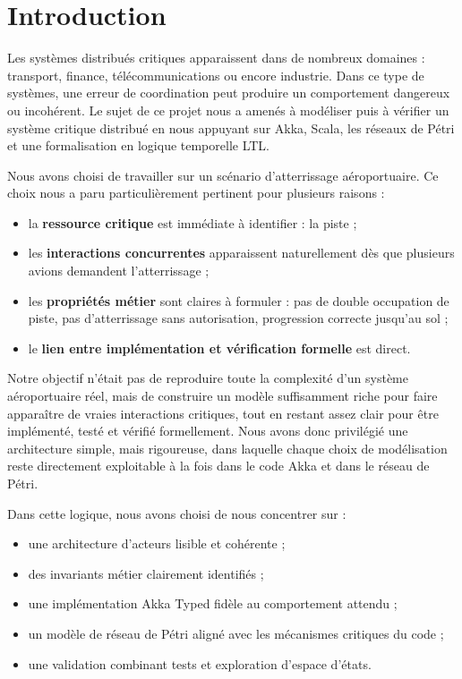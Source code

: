 \documentclass[11pt,a4paper]{article}
\begin{document}
\tableofcontents
\clearpage
{}

\section{Introduction}

Les systèmes distribués critiques apparaissent dans de nombreux domaines : transport, finance, télécommunications ou encore industrie. Dans ce type de systèmes, une erreur de coordination peut produire un comportement dangereux ou incohérent. Le sujet de ce projet nous a amenés à modéliser puis à vérifier un système critique distribué en nous appuyant sur Akka, Scala, les réseaux de Pétri et une formalisation en logique temporelle LTL.

Nous avons choisi de travailler sur un scénario d'atterrissage aéroportuaire. Ce choix nous a paru particulièrement pertinent pour plusieurs raisons :
\begin{itemize}
    \item la \textbf{ressource critique} est immédiate à identifier : la piste ;
    \item les \textbf{interactions concurrentes} apparaissent naturellement dès que plusieurs avions demandent l'atterrissage ;
    \item les \textbf{propriétés métier} sont claires à formuler : pas de double occupation de piste, pas d'atterrissage sans autorisation, progression correcte jusqu'au sol ;
    \item le \textbf{lien entre implémentation et vérification formelle} est direct.
\end{itemize}

Notre objectif n'était pas de reproduire toute la complexité d'un système aéroportuaire réel, mais de construire un modèle suffisamment riche pour faire apparaître de vraies interactions critiques, tout en restant assez clair pour être implémenté, testé et vérifié formellement. Nous avons donc privilégié une architecture simple, mais rigoureuse, dans laquelle chaque choix de modélisation reste directement exploitable à la fois dans le code Akka et dans le réseau de Pétri.

Dans cette logique, nous avons choisi de nous concentrer sur :
\begin{itemize}
    \item une architecture d'acteurs lisible et cohérente ;
    \item des invariants métier clairement identifiés ;
    \item une implémentation Akka Typed fidèle au comportement attendu ;
    \item un modèle de réseau de Pétri aligné avec les mécanismes critiques du code ;
    \item une validation combinant tests et exploration d'espace d'états.
\end{itemize}
\end{document}
